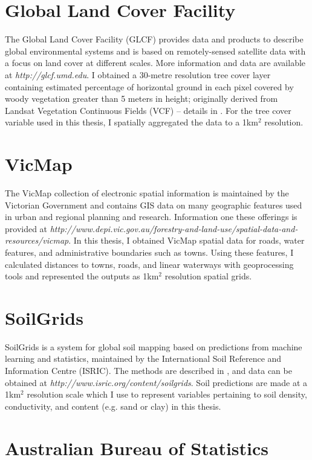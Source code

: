 \section{Global Land Cover Facility}

The Global Land Cover Facility (GLCF) provides data and products to describe global environmental systems and is based on remotely-sensed satellite data with a focus on land cover at different scales. More information and data are available at \textit{http://glcf.umd.edu}. I obtained a 30-metre resolution tree cover layer containing estimated percentage of horizontal ground in each pixel covered by woody vegetation greater than 5 meters in height; originally derived from Landsat Vegetation Continuous Fields (VCF) -- details in \cite{sext13}. For the tree cover variable used in this thesis, I spatially aggregated the data to a 1km$^2$ resolution.

\section{VicMap}

The VicMap collection of electronic spatial information is maintained by the Victorian Government and contains GIS data on many geographic features used in urban and regional planning and research. Information one these offerings is provided at \textit{http://www.depi.vic.gov.au/forestry-and-land-use/spatial-data-and-resources/vicmap}. In this thesis, I obtained VicMap spatial data for roads, water features, and administrative boundaries such as towns. Using these features, I calculated distances to towns, roads, and linear waterways with geoprocessing tools and represented the outputs as 1km$^2$ resolution spatial grids.

\section{SoilGrids}

SoilGrids is a system for global soil mapping based on predictions from machine learning and statistics, maintained by the International Soil Reference and Information Centre (ISRIC). The methods are described in \cite{heng14}, and data can be obtained at \textit{http://www.isric.org/content/soilgrids}. Soil predictions are made at a 1km$^2$ resolution scale which I use to represent variables pertaining to soil density, conductivity, and content (e.g. sand or clay) in this thesis.

\section{Australian Bureau of Statistics}


